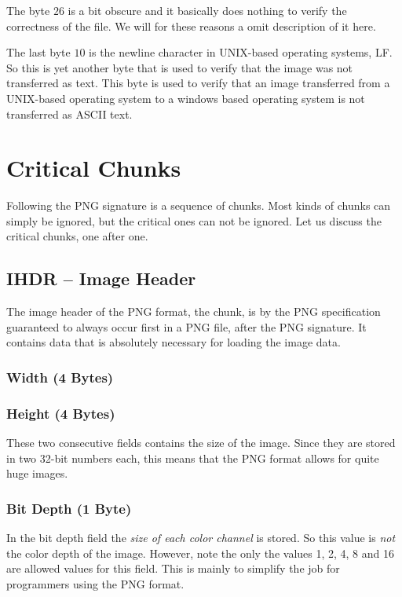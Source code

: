 The byte $26$ is a bit obscure and it basically does nothing to verify
the correctness of the file. We will for these reasons a omit
description of it here.

The last byte $10$ is the newline character in UNIX-based operating
systems, LF. So this is yet another byte that is used to verify that
the image was not transferred as text. This byte is used to verify
that an image transferred from a UNIX-based operating system to a
windows based operating system is not transferred as ASCII text.

\section{Critical Chunks}

Following the PNG signature is a sequence of chunks. Most kinds of
chunks can simply be ignored, but the critical ones can not be
ignored. Let us discuss the critical chunks, one after one.

\subsection{IHDR -- Image Header}

The image header of the PNG format, the  chunk, is by the
PNG specification guaranteed to always occur first in a PNG file,
after the PNG signature. It contains data that is absolutely necessary
for loading the image data.

\subsubsection*{Width (4 Bytes)}
\subsubsection*{Height (4 Bytes)}

These two consecutive fields contains the size of the image. Since
they are stored in two 32-bit numbers each, this means that the PNG
format allows for quite huge images.

\subsubsection*{Bit Depth (1 Byte)}

In the bit depth field the \textit{size of each color channel} is
stored. So this value is \textit{not} the color depth of the
image. However, note the only the values 1, 2, 4, 8 and 16 are allowed
values for this field. This is mainly to simplify the job for
programmers using the PNG format.

